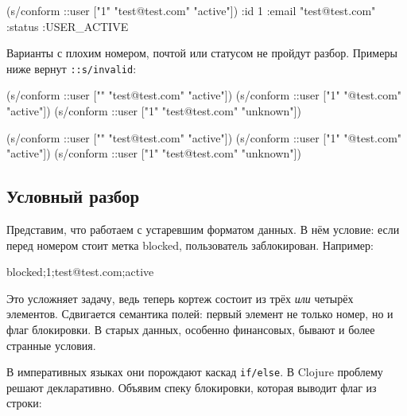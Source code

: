 \else

\begin{english}
  \begin{clojure}
(s/conform ::user ["1" "test@test.com" "active"])
{:id 1
 :email "test@test.com"
 :status :USER_ACTIVE}
  \end{clojure}
\end{english}

\fi

Варианты с плохим номером, почтой или статусом не пройдут разбор. Примеры ниже
вернут \verb|::s/invalid|:

\ifx\DEVICETYPE\MOBILE

\begin{english}
  \begin{clojure}
(s/conform ::user
  ["" "test@test.com" "active"])
(s/conform ::user
  ["1" "@test.com" "active"])
(s/conform ::user
  ["1" "test@test.com" "unknown"])
  \end{clojure}
\end{english}

\else

\begin{english}
  \begin{clojure}
(s/conform ::user ["" "test@test.com" "active"])
(s/conform ::user ["1" "@test.com" "active"])
(s/conform ::user ["1" "test@test.com" "unknown"])
  \end{clojure}
\end{english}

\fi

\subsection{Условный разбор}

Представим, что работаем с устаревшим форматом данных. В нём условие: если
перед номером стоит метка blocked, пользователь заблокирован. Например:

\begin{english}
  \begin{text}
blocked;1;test@test.com;active
  \end{text}
\end{english}

Это усложняет задачу, ведь теперь кортеж состоит из трёх \emph{или} четырёх
элементов. Сдвигается семантика полей: первый элемент не только номер, но и флаг
блокировки. В старых данных, особенно финансовых, бывают и более странные
условия.

В императивных языках они порождают каскад \verb|if/else|. В Clojure проблему
решают декларативно. Объявим спеку блокировки, которая выводит флаг из строки:

